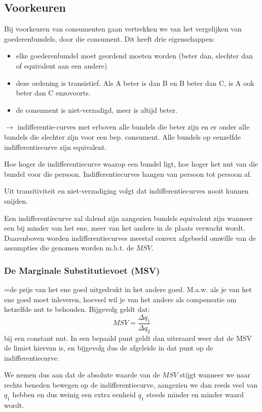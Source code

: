 \subsection{Voorkeuren}
Bij voorkeuren van consumenten gaan vertrekken we van het vergelijken van goederenbundels, door die consument. Dit heeft drie eigenschappen:
\begin{itemize}
	\item elke goederenbundel moet geordend moeten worden (beter dan, slechter dan of equivalent aan een andere)
    \item deze ordening is transistief. Als A beter is dan B en B beter dan C, is A ook beter dan C enzovoorts.
    \item de consument is niet-verzadigd, meer is altijd beter.
\end{itemize}

$\rightarrow$ indifferentie-curves met erboven alle bundels die beter zijn en er onder alle bundels die slechter zijn voor een bep. consument. Alle bundels op eenzelfde indifferentiecurve zijn equivalent.

Hoe hoger de indifferentiecurve waarop een bundel ligt, hoe hoger het nut van die bundel voor die persoon. Indifferentiecurves hangen van persoon tot persoon af.

Uit transitiviteit en niet-verzadiging volgt dat indifferentiecurves nooit kunnen snijden.

Een indifferentiecurve zal dalend zijn aangezien bundels equivalent zijn wanneer een bij minder van het ene, meer van het andere in de plaats verwacht wordt. Daarenboven worden indifferentiecurves meestal convex afgebeeld omwille van de assumpties die genomen worden m.b.t. de $MSV$.

\subsubsection{De Marginale Substitutievoet (MSV)}
=de prijs van het ene goed uitgedrukt in het andere goed. M.a.w. als je van het ene goed moet inleveren, hoeveel wil je van het andere als compensatie om hetzelfde nut te behouden. Bijgevolg geldt dat:
\begin{equation}
	MSV = \frac{\Delta q_1}{\Delta q_2}
\end{equation}
bij een constant nut. In een bepaald punt geldt dan uiteraard weer dat de MSV de limiet hiervan is, en bijgevolg dus de afgeleide in dat punt op de indifferentiecurve.

We nemen dus aan dat de absolute waarde van de $MSV$ stijgt wanneer we naar rechts beneden bewegen op de indifferentiecurve, aangezien we dan reeds veel van $q_1$ hebben en dus weinig een extra eenheid $q_1$ steeds minder en minder waard wordt.

